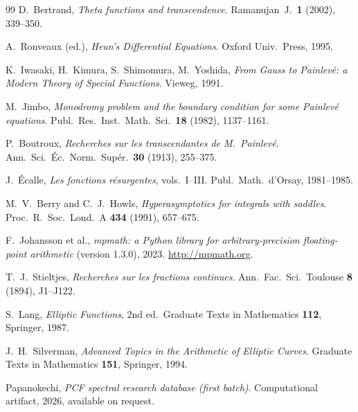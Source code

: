 \documentclass[11pt,reqno]{amsart}
\theoremstyle{definition}
\begin{document}
\begin{thebibliography}{99}
D.~Bertrand, \emph{Theta functions and transcendence}.
Ramanujan~J.\ \textbf{1} (2002), 339--350.

A.~Ronveaux (ed.), \emph{Heun's Differential Equations}.
Oxford Univ.\ Press, 1995.

K.~Iwasaki, H.~Kimura, S.~Shimomura, M.~Yoshida,
\emph{From Gauss to Painlev\'e: a Modern Theory of Special
Functions}. Vieweg, 1991.

M.~Jimbo, \emph{Monodromy problem and the boundary
condition for some Painlev\'e equations}.
Publ.\ Res.\ Inst.\ Math.\ Sci.\ \textbf{18} (1982), 1137--1161.

P.~Boutroux, \emph{Recherches sur les transcendantes de M.\
Painlev\'e}. Ann.\ Sci.\ \'Ec.\ Norm.\ Sup\'er.\ \textbf{30}
(1913), 255--375.

J.~\'Ecalle, \emph{Les fonctions r\'esurgentes}, vols.\ I--III.
Publ.\ Math.\ d'Orsay, 1981--1985.

M.~V.~Berry and C.~J.~Howls, \emph{Hyperasymptotics for
integrals with saddles}.
Proc.\ R.\ Soc.\ Lond.\ A \textbf{434} (1991), 657--675.

F.~Johansson et al.,
\emph{mpmath: a Python library for arbitrary-precision
floating-point arithmetic} (version 1.3.0), 2023.
\url{http://mpmath.org}.

T.~J.~Stieltjes, \emph{Recherches sur les fractions continues}.
Ann.\ Fac.\ Sci.\ Toulouse \textbf{8} (1894), J1--J122.

S.~Lang, \emph{Elliptic Functions}, 2nd ed.\ Graduate Texts
in Mathematics \textbf{112}, Springer, 1987.

J.~H.~Silverman, \emph{Advanced Topics in the Arithmetic of
Elliptic Curves}. Graduate Texts in Mathematics \textbf{151},
Springer, 1994.

Papanokechi, \emph{PCF spectral research database
(first batch)}. Computational artifact, 2026, available
on request.

\end{thebibliography}
\end{document}
